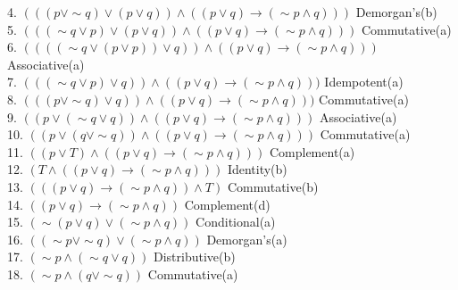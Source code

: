 \documentclass{article}
\begin{document}
4. $(((p \vee \sim q) \vee (p \vee q))\wedge ((p \vee q) \rightarrow ( \sim p \wedge q))) $ \hspace*{\fill} Demorgan's(b) \\
5. $(((\sim q \vee p) \vee (p \vee q))\wedge ((p \vee q) \rightarrow ( \sim p \wedge q))) $ \hspace*{\fill} Commutative(a) \\
6. $((((\sim q \vee (p\vee p)) \vee q))\wedge ((p \vee q) \rightarrow ( \sim p \wedge q))) $ \hspace*{\fill} Associative(a) \\
7. $(((\sim q \vee p) \vee q))\wedge ((p \vee q) \rightarrow ( \sim p \wedge q))) $ \hspace*{\fill} Idempotent(a) \\
8. $(((p \vee \sim q) \vee q))\wedge ((p \vee q) \rightarrow ( \sim p \wedge q))) $ \hspace*{\fill} Commutative(a) \\
9. $((p \vee (\sim q \vee q))\wedge ((p \vee q) \rightarrow ( \sim p \wedge q))) $ \hspace*{\fill} Associative(a) \\
10. $((p \vee ( q \vee \sim q))\wedge ((p \vee q) \rightarrow ( \sim p \wedge q))) $ \hspace*{\fill} Commutative(a) \\
11. $((p \vee T)\wedge ((p \vee q) \rightarrow ( \sim p \wedge q))) $ \hspace*{\fill} Complement(a) \\
12. $(T\wedge ((p \vee q) \rightarrow ( \sim p \wedge q))) $ \hspace*{\fill} Identity(b) \\
13. $(((p \vee q) \rightarrow ( \sim p \wedge q)) \wedge T) $ \hspace*{\fill} Commutative(b) \\
14. $((p \vee q) \rightarrow ( \sim p \wedge q)) $ \hspace*{\fill} Complement(d) \\
15. $(\sim (p \vee q )\vee (\sim p \wedge q))$ \hspace*{\fill} Conditional(a) \\
16. $((\sim p \vee \sim q )\vee (\sim p \wedge q))$ \hspace*{\fill} Demorgan's(a) \\
17. $( \sim p \wedge (\sim q \vee q))$ \hspace*{\fill} Distributive(b) \\
18. $( \sim p \wedge (q \vee \sim q))$ \hspace*{\fill} Commutative(a) \\
\end{document}

